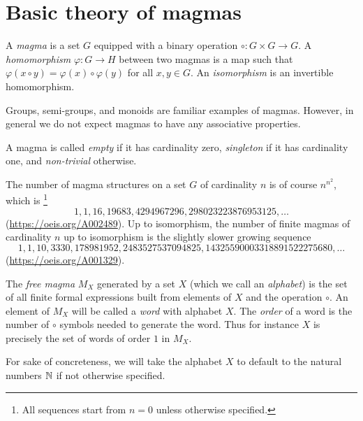 \chapter{Basic theory of magmas}

\begin{definition}[Magma]\label{magma-def}\leanok A \emph{magma} is a set $G$ equipped with a binary operation $\circ: G \times G \to G$.  A \emph{homomorphism} $\varphi : G \to H$ between two magmas is a map such that $\varphi(x \circ y) = \varphi(x) \circ \varphi(y)$ for all $x,y \in G$.  An \emph{isomorphism} is an invertible homomorphism.
\end{definition}

Groups, semi-groups, and monoids are familiar examples of magmas.  However, in general we do not expect magmas to have any associative properties.

A magma is called \emph{empty} if it has cardinality zero, \emph{singleton} if it has cardinality one, and \emph{non-trivial} otherwise.

The number of magma structures on a set $G$ of cardinality $n$ is of course $n^{n^2}$, which is \footnote{All sequences start from $n=0$ unless otherwise specified.}
$$ 1, 1, 16, 19683, 4294967296, 298023223876953125, \dots$$
(\href{OEIS A002489}{https://oeis.org/A002489}).
Up to isomorphism, the number of finite magmas of cardinality $n$ up to isomorphism is the slightly slower growing sequence
$$ 1, 1, 10, 3330, 178981952, 2483527537094825, 14325590003318891522275680, \dots$$
(\href{OEIS A001329}{https://oeis.org/A001329}).

\begin{definition}\label{free-magma-def}\leanok{} The \emph{free magma} $M_X$ generated by a set $X$ (which we call an \emph{alphabet}) is the set of all finite formal expressions built from elements of $X$ and the operation $\circ$.  An element of $M_X$ will be called a \emph{word} with alphabet $X$.  The \emph{order} of a word is the number of $\circ$ symbols needed to generate the word.  Thus for instance $X$ is precisely the set of words of order $1$ in $M_X$.
\end{definition}

For sake of concreteness, we will take the alphabet $X$ to default to the natural numbers $\mathbb{N}$ if not otherwise specified.

